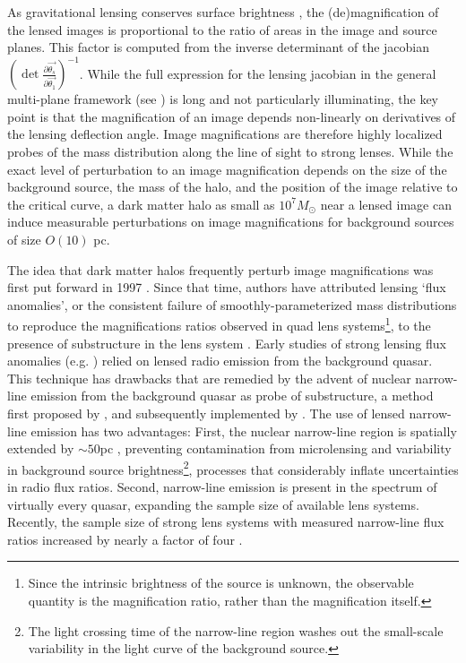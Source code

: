 As gravitational lensing conserves surface brightness \citep{MisnerThorneWheeler}, the (de)magnification of the lensed images is proportional to the ratio of areas in the image and source planes. This factor is computed from the inverse determinant of the jacobian $\left(\det \frac{\partial \vec{\theta_s}}{\partial \vec{\theta_1}}\right)^{-1}$. While the full expression for the lensing jacobian in the general multi-plane framework (see \citet{BlandfordNarayan86}) is long and not particularly illuminating, the key point is that the magnification of an image depends non-linearly on derivatives of the lensing deflection angle. Image magnifications are therefore highly localized probes of the mass distribution along the line of sight to strong lenses. While the exact level of perturbation to an image magnification depends on the size of the background source, the mass of the halo, and the position of the image relative to the critical curve, a dark matter halo as small as $10^7 M_{\odot}$ near a lensed image can induce measurable perturbations on image magnifications for background sources of size $O\left(10\right)$ pc. 

The idea that dark matter halos frequently perturb image magnifications was first put forward in 1997 \citep{MaoSchneider98}. Since that time, authors have attributed lensing `flux anomalies', or the consistent failure of smoothly-parameterized mass distributions to reproduce the magnifications ratios observed in quad lens systems\footnote{Since the intrinsic brightness of the source is unknown, the observable quantity is the magnification ratio, rather than the magnification itself.}, to the presence of substructure in the lens system \citep{Metcalf++02,D+K02,FadleyKeeton12,Xu++12,Nierenberg++14,Nierenberg++19}. Early studies of strong lensing flux anomalies (e.g. \citet{D+K02}) relied on lensed radio emission from the background quasar. This technique has drawbacks that are remedied by the advent of nuclear narrow-line emission from the background quasar as probe of substructure, a method first proposed by \citet{MoustakasMetcalf02}, and subsequently implemented by \citet{Sugai++07,Nierenberg++14,Nierenberg++17,Nierenberg++19}. The use of lensed narrow-line emission has two advantages: First, the nuclear narrow-line region is spatially extended by $\sim 50$pc \citep{MullerSanchez++11}, preventing contamination from microlensing and variability in background source brightness\footnote{The light crossing time of the narrow-line region washes out the small-scale variability in the light curve of the background source.}, processes that considerably inflate uncertainties in radio flux ratios. Second, narrow-line emission is present in the spectrum of virtually every quasar, expanding the sample size of available lens systems. Recently, the sample size of strong lens systems with measured narrow-line flux ratios increased by nearly a factor of four \citep{Nierenberg++19}. 

